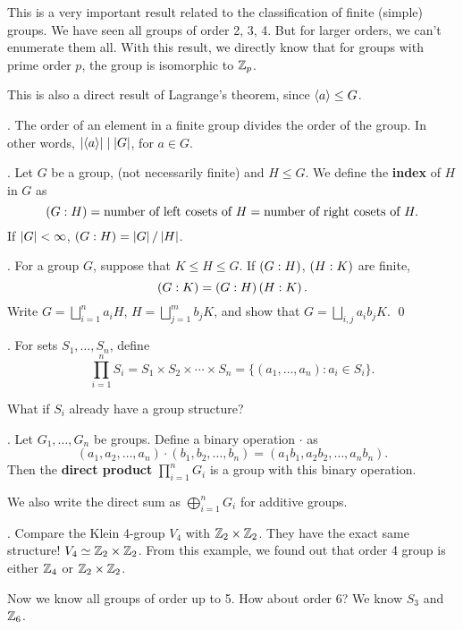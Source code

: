 This is a very important result related to the classification of finite (simple) groups. We have seen all groups of order 2, 3, 4. But for larger orders, we can't enumerate them all. With this result, we directly know that for groups with prime order \(p\), the group is isomorphic to \(\mathbb{Z}_p\).

\medskip

This is also a direct result of Lagrange's theorem, since \(\left\langle a \right\rangle \leq G\).

\thm. The order of an element in a finite group divides the order of the group. In other words, \(\left| \left\langle a \right\rangle \right| \mid \left| G \right|\), for \(a \in G\).

.  Let \(G\) be a group, (not necessarily finite) and \(H \leq G\). We define the \textbf{index} of \(H\) in \(G\) as
\[
    \left(G : H\right) = \text{number of left cosets of } H = \text{number of right cosets of } H.
\]
If \(\left| G \right| < \infty\), \(\left(G : H\right) = \left| G \right| / \left| H \right|\).

\thm. For a group \(G\), suppose that \(K \leq H \leq G\). If \(\left(G : H\right)\), \(\left(H : K\right)\) are finite,
\[
    \left(G : K\right) = \left(G : H\right)\left(H : K\right).
\]
\pf Write \(G = \bigsqcup_{i=1}^n a_i H\), \(H = \bigsqcup_{j=1}^m b_j K\), and show that \(G = \bigsqcup_{i, j} a_i b_j K\). \qed


.  For sets \(S_1, \dots, S_n\), define
\[
    \prod_{i=1}^n S_i = S_1 \times S_2 \times \cdots \times S_n = \{(a_1, \dots, a_n) : a_i \in S_i\}.
\]

What if \(S_i\) already have a group structure?

.  Let \(G_1, \dots, G_n\) be groups. Define a binary operation \(\cdot\) as
\[
    (a_1, a_2, \dots, a_n) \cdot (b_1, b_2, \dots, b_n) = (a_1b_1, a_2b_2, \dots, a_nb_n).
\]
Then the \textbf{direct product} \(\prod_{i=1}^n G_i\) is a group with this binary operation.

\notation We also write the direct sum as \(\bigoplus_{i=1}^n G_i\) for additive groups.

\ex. Compare the Klein 4-group \(V_4\) with \(\mathbb{Z}_2 \times \mathbb{Z}_2\). They have the exact same structure! \(V_4 \simeq \mathbb{Z}_2 \times \mathbb{Z}_2\). From this example, we found out that order 4 group is either \(\mathbb{Z}_4\) or \(\mathbb{Z}_2 \times \mathbb{Z}_2\).

Now we know all groups of order up to 5. How about order 6? We know \(S_3\) and \(\mathbb{Z}_6\).

